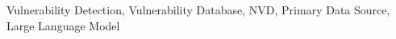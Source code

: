 \documentclass{css}
\begin{document}

\begin{ekeyword}
Vulnerability Detection, Vulnerability Database, NVD, Primary Data Source, Large Language Model
\end{ekeyword}

\maketitle










\end{document}
